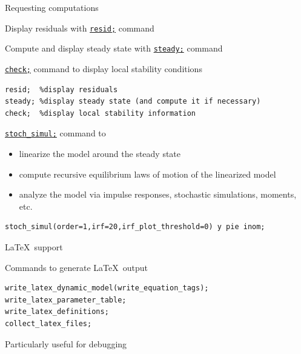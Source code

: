 \documentclass[handout,usepdftitle=false,xcolor=dvipsnames,aspectratio=169]{beamer}
\begin{document}
\begin{frame}[fragile]{Requesting computations}
\begin{witemize}
	  \item Display residuals with \href{https://www.dynare.org/manual/the-model-file.html?highlight=resid#resid}{\texttt{resid;}} command
	  \item Compute and display steady state with \href{https://www.dynare.org/manual/the-model-file.html?highlight=steady#steady}{\texttt{steady;}} command
	\item \href{https://www.dynare.org/manual/the-model-file.html?highlight=check#check}{\texttt{check;}} command to display local stability conditions
\begin{verbatim}
resid;  %display residuals
steady; %display steady state (and compute it if necessary)
check;  %display local stability information
\end{verbatim}
	\item \href{https://www.dynare.org/manual/the-model-file.html?highlight=stoch_simul#stoch_simul}{\texttt{stoch\_simul;}} command  to
	\begin{itemize}
		\item linearize the model around the steady state
		\item compute recursive equilibrium laws of motion of the linearized model
		\item analyze the model via impulse responses, stochastic simulations, moments, etc.
	\end{itemize}\vspace{0.2cm}
\begin{verbatim}
stoch_simul(order=1,irf=20,irf_plot_threshold=0) y pie inom;
\end{verbatim}
\end{witemize}
\end{frame}

\begin{frame}[fragile]{\LaTeX\ support}
\begin{witemize}
    \item 	 Commands to generate \LaTeX\ output
\begin{verbatim}
write_latex_dynamic_model(write_equation_tags);
write_latex_parameter_table;
write_latex_definitions;
collect_latex_files;
\end{verbatim}
\item Particularly useful for debugging
\end{witemize}
\end{frame}
\end{document}
